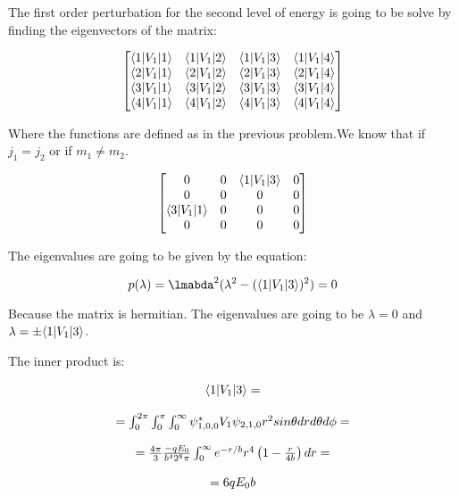 The first order perturbation for the second level of energy is going to be solve by finding the eigenvectors of the matrix:

\begin{equation}
  \begin{bmatrix}
    \langle1\rvert V_1\lvert1\rangle & \langle1\rvert V_1\lvert2\rangle & \langle1\rvert V_1\lvert3\rangle & \langle1\rvert V_1\lvert4\rangle\\
    \langle2\rvert V_1\lvert1\rangle & \langle2\rvert V_1\lvert2\rangle & \langle2\rvert V_1\lvert3\rangle & \langle2\rvert V_1\lvert4\rangle\\
    \langle3\rvert V_1\lvert1\rangle & \langle3\rvert V_1\lvert2\rangle & \langle3\rvert V_1\lvert3\rangle & \langle3\rvert V_1\lvert4\rangle\\
    \langle4\rvert V_1\lvert1\rangle & \langle4\rvert V_1\lvert2\rangle & \langle4\rvert V_1\lvert3\rangle & \langle4\rvert V_1\lvert4\rangle
  \end{bmatrix}
\end{equation}

Where the functions are defined as in the previous problem.We know that if $j_1=j_2$ or if $m_1 \neq m_2$.

\begin{equation}
  \begin{bmatrix}
    0 & 0 & \langle1\rvert V_1\lvert3\rangle & 0\\
    0 & 0 & 0 & 0\\
    \langle3\rvert V_1\lvert1\rangle & 0 & 0 & 0\\
    0 & 0 & 0 & 0
  \end{bmatrix}
\end{equation}

The eigenvalues are going to be given by the equation:

\begin{equation}
  p(\lambda) = \lmabda^2(\lambda^2-(\bra{1}V_1\ket{3})^2) = 0
\end{equation}

Because the matrix is hermitian. The eigenvalues are going to be $\lambda = 0$ and $\lambda = \pm \langle1\rvert V_1\lvert3\rangle$.

The inner product is:

\begin{equation}
  \begin{array}{c}
    \langle1\rvert V_1\lvert3\rangle =
    \\

    \\
    = \int_{0}^{2\pi} \int_{0}^{\pi} \int_{0}^{\infty} \psi_{1,0,0}^* V_1 \psi_{2,1,0} r^2 sin\theta dr d\theta d\phi =
    \\

    \\
    = \frac{4\pi}{3} \frac{-qE_0}{b^42^8\pi}\int_{0}^{\infty} e^{-r/b} r^4 \left(1-\frac{r}{4b}\right) dr =
    \\

    \\
    = 6 q E_0 b
  \end{array}
\end{equation}

